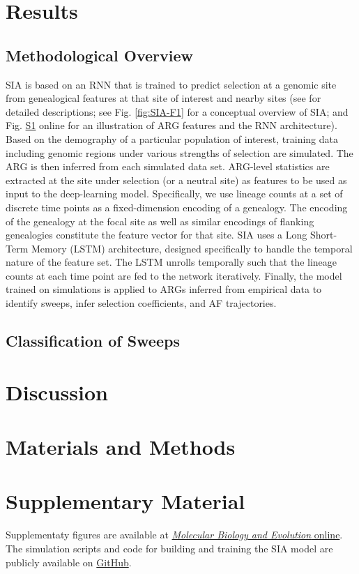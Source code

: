 \section{Results}
\subsection{Methodological Overview}
SIA is based on an RNN that is trained to predict selection at a genomic site from genealogical features at that site of interest and nearby sites (see  for detailed descriptions; see Fig. \ref{fig:SIA-F1} for a conceptual overview of SIA; and Fig. \href{https://academic.oup.com/mbe/article/39/1/msab332/6433161#supplementary-data}{S1} online for an illustration of ARG features and the RNN architecture). Based on the demography of a particular population of interest, training data including genomic regions under various strengths of selection are simulated. The ARG is then inferred from each simulated data set. ARG-level statistics are extracted at the site under selection (or a neutral site) as features to be used as input to the deep-learning model. Specifically, we use lineage counts at a set of discrete time points as a fixed-dimension encoding of a genealogy. The encoding of the genealogy at the focal site as well as similar encodings of flanking genealogies constitute the feature vector for that site. SIA uses a Long Short-Term Memory (LSTM) architecture, designed specifically to handle the temporal nature of the feature set. The LSTM unrolls temporally such that the lineage counts at each time point are fed to the network iteratively. Finally, the model trained on simulations is applied to ARGs inferred from empirical data to identify sweeps, infer selection coefficients, and AF trajectories.

\subsection{Classification of Sweeps}



\section{Discussion}

\section{Materials and Methods} \label{methods}

\section{Supplementary Material}

Supplementaty figures are available at \href{https://academic.oup.com/mbe/article/39/1/msab332/6433161#supplementary-data}{\textit{Molecular Biology and Evolution} online}. The simulation scripts and code for building and training the SIA model are publicly available on \href{https://github.com/CshlSiepelLab/arg-selection}{GitHub}.